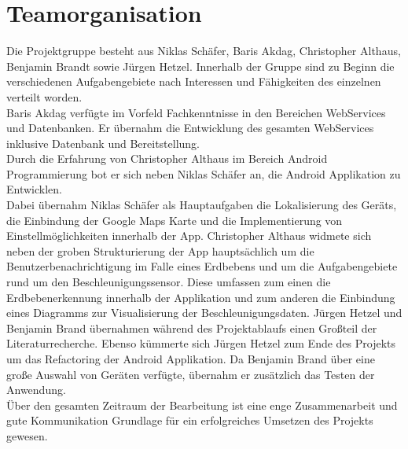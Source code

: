 \section{Teamorganisation}
Die Projektgruppe besteht aus Niklas Schäfer, Baris Akdag, Christopher Althaus, Benjamin Brandt sowie Jürgen Hetzel. Innerhalb der Gruppe sind zu Beginn die verschiedenen Aufgabengebiete nach Interessen und Fähigkeiten des einzelnen verteilt worden.\\
Baris Akdag verfügte im Vorfeld Fachkenntnisse in den Bereichen WebServices und Datenbanken. Er übernahm die Entwicklung des gesamten WebServices inklusive Datenbank und Bereitstellung.\\
Durch die Erfahrung von Christopher Althaus im Bereich Android Programmierung bot er sich neben Niklas Schäfer an, die Android Applikation zu Entwicklen.\\
Dabei übernahm Niklas Schäfer als Hauptaufgaben die Lokalisierung des Geräts, die Einbindung der Google Maps Karte und die Implementierung von Einstellmöglichkeiten innerhalb der App. Christopher Althaus widmete sich neben der groben Strukturierung der App hauptsächlich um die Benutzerbenachrichtigung im Falle eines Erdbebens und um die Aufgabengebiete rund um den Beschleunigungssensor. Diese umfassen zum einen die Erdbebenerkennung innerhalb der Applikation und zum anderen die Einbindung eines Diagramms zur Visualisierung der Beschleunigungsdaten. Jürgen Hetzel und Benjamin Brand übernahmen während des Projektablaufs einen Großteil der Literaturrecherche. Ebenso kümmerte sich Jürgen Hetzel zum Ende des Projekts um das Refactoring der Android Applikation.
Da Benjamin Brand über eine große Auswahl von Geräten verfügte, übernahm er zusätzlich das Testen der Anwendung.\\
Über den gesamten Zeitraum der Bearbeitung ist eine enge Zusammenarbeit und gute Kommunikation Grundlage für ein erfolgreiches Umsetzen des Projekts gewesen.
\newpage